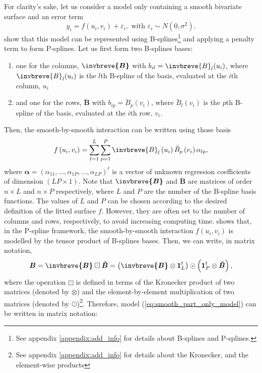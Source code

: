 For clarity's sake, let us consider a model only containing a smooth bivariate surface and an error term
	\begin{equation}
	    y _ { i } = f \left( u _ { i } , v _ { i } \right) + \varepsilon _ { i } , \text { with } \varepsilon _ { i } \sim N 
	    \left( 0 , \sigma ^ { 2 } \right) \text{.}
		\label{eq:smooth_part_only_model}
	\end{equation}
\textcite{lee_efficient_2013} show that this model can be represented using B-splines\footnote{See appendix \ref{appendix:add_info} for details about B-splines and P-splines.} and applying a penalty term to form P-splines. Let us first form two B-splines bases:
\begin{enumerate}
\item one for the columns, $\boldsymbol{\invbreve{B}}$ with $ b_{il}= \invbreve{B}_l(u_i)$, where $\invbreve{B}_l(u_i)$ is the $l$th B-spline of the basis, evaluated at the $i$th column, $u_i$
\item and one for the rows, $\boldsymbol{\breve{B}}$ with $ b_{ip}= \breve{B}_p(v_i)$, where $\breve{B}_l(v_i)$ is the $p$th B-spline of the basis, evaluated at the $i$th row, $v_i$.
\end{enumerate}
Then, the smooth-by-smooth interaction can be written using those basis
\begin{equation}
	f \left(u_{i},v_{i}\right)=\sum_{l=1}^{L}\sum_{p=1}^{P}\invbreve{B}_{l}\left(u_{i}\right)\breve{B}_{p}\left(v_{i}\right) 
	\alpha_{lp}\text{,}
\end{equation}
where $\boldsymbol{\alpha} = (\alpha_{11},\ldots,\alpha_{1P},\ldots,\alpha_{LP})^t$ is a vector of unknown regression coefficients of dimension $(LP \times 1)$. Note that $\boldsymbol{\invbreve{B}}$ and $\boldsymbol{\breve{B}}$ are matrices of order $n \times L$ and $n\times P$ respectively, where $L$ and $P$ are the number of the B-spline basis functions. The values of $L$ and $P$ can be chosen according to the desired definition of the fitted surface $f$. However, they are often set to the number of columns and rows, respectively, to avoid increasing computing time. \textcite{dierckx_curve_1995} shows that, in the P-spline framework, the smooth-by-smooth interaction $f(u_i,v_i)$ is modelled by the tensor product of B-splines bases. Then, we can write, in matrix notation,
\begin{equation}
    \boldsymbol{B} = \boldsymbol{\invbreve{B}} \boxdot \boldsymbol{\breve{B}} = \left( \boldsymbol{\invbreve{B}} \otimes
    \boldsymbol{1} _ { L } ^ { t } \right) \odot \left( \mathbf { 1 } _ { P } ^ { t } \otimes \boldsymbol{\breve{B}} \right)
    \text{,}
\end{equation}
where the operation $\boxdot$ is defined in terms of the Kronecker product of two matrices (denoted by $\otimes$) and the 
element-by-element multiplication of two matrices (denoted by $\odot$)\footnote{See appendix \ref{appendix:add_info} for details 
about the Kronecker, and the element-wise products}. Therefore, model (\ref{eq:smooth_part_only_model}) can be written in matrix 
notation:

